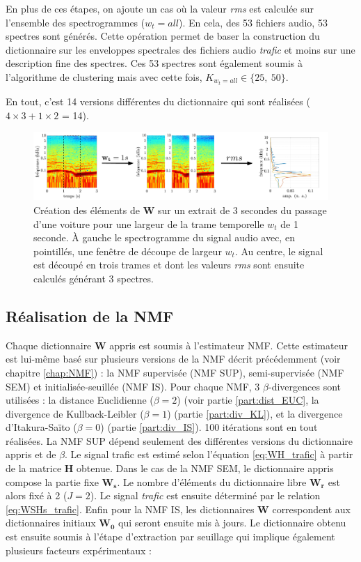En plus de ces étapes, on ajoute un cas où la valeur \textit{rms} est calculée sur l'ensemble des spectrogrammes ($w_t = all$). En cela, des 53 fichiers audio, 53 spectres sont générés. Cette opération permet de baser la construction du dictionnaire sur les enveloppes spectrales des fichiers audio \textit{trafic} et moins sur une description fine des spectres. Ces 53 spectres sont également soumis à l'algorithme de clustering mais avec cette fois, $K_{w_t = all} \in \lbrace 25,~ 50 \rbrace$. 

En tout, c'est 14 versions différentes du dictionnaire qui sont réalisées ($4\times 3 + 1 \times 2$ = 14).

\begin{figure}[hbtp]
\centering
\includegraphics[width=\linewidth]{./figures/NMF/dictionaire_frame_FR.pdf} 
\caption{Création des éléments de $\mathbf{W}$ sur un extrait de 3 secondes du passage d'une voiture pour une largeur de la trame temporelle $w_t$ de 1 seconde. À gauche le spectrogramme du signal audio avec, en pointillés, une fenêtre de découpe de largeur $w_t$. Au centre, le signal est découpé en trois trames et dont les valeurs \textit{rms} sont ensuite calculés générant 3 spectres. }
\label{fig:decoupe_W}
\end{figure}

\subsection{Réalisation de la NMF}

Chaque dictionnaire $\mathbf{W}$ appris est soumis à l'estimateur NMF. Cette estimateur est lui-même basé sur plusieurs versions de la NMF décrit précédemment (voir chapitre \ref{chap:NMF})  : la NMF supervisée (NMF SUP), semi-supervisée (NMF SEM) et initialisée-seuillée (NMF IS). Pour chaque NMF, 3 $\beta$-divergences sont utilisées : la distance Euclidienne ($\beta = 2$) (voir partie \ref{part:dist_EUC}, la divergence de Kullback-Leibler ($\beta = 1$) (partie \ref{part:div_KL}), et la divergence d'Itakura-Saïto ($\beta = 0$) (partie \ref{part:div_IS}). 100 itérations sont en tout réalisées. 
La NMF SUP dépend seulement des différentes versions du dictionnaire appris et de $\beta$. Le signal trafic est estimé selon l'équation \ref{eq:WH_trafic} à partir de la matrice $\mathbf{H}$ obtenue.
Dans le cas de la NMF SEM, le dictionnaire appris compose la partie fixe $\mathbf{W_s}$. Le nombre d'éléments du dictionnaire libre $\mathbf{W_r}$ est alors fixé à 2 ($J = 2$). Le signal \textit{trafic} est ensuite déterminé par le relation \ref{eq:WSHs_trafic}. 
Enfin pour la NMF IS, les dictionnaires $\mathbf{W}$ correspondent aux dictionnaires initiaux $\mathbf{W_0}$ qui seront ensuite mis à jours. Le dictionnaire obtenu est ensuite soumis à l'étape d'extraction par seuillage qui implique également plusieurs facteurs expérimentaux : 

